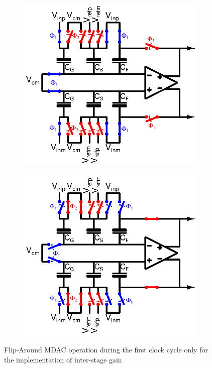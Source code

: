 \begin{figure}[htp]
	\centering
	\begin{subfigure}[b]{0.45\textwidth}
		\centering
		\includegraphics[width=\textwidth]{Chapter4/Figs/algorithmic-Cg-phi1.ps}
		\label{fig:algo-Cg-phi1}
	\end{subfigure}
	\begin{subfigure}[b]{0.45\textwidth}
		\centering
		\includegraphics[width=\textwidth]{Chapter4/Figs/algorithmic-Cg-phi2.ps}
		\label{fig:algo-Cg-phi2}
	\end{subfigure}
	\caption{Flip-Around MDAC operation during the first clock cycle only for the implementation of inter-stage gain}
	\label{fig:algo-mdac-cg}
\end{figure}

